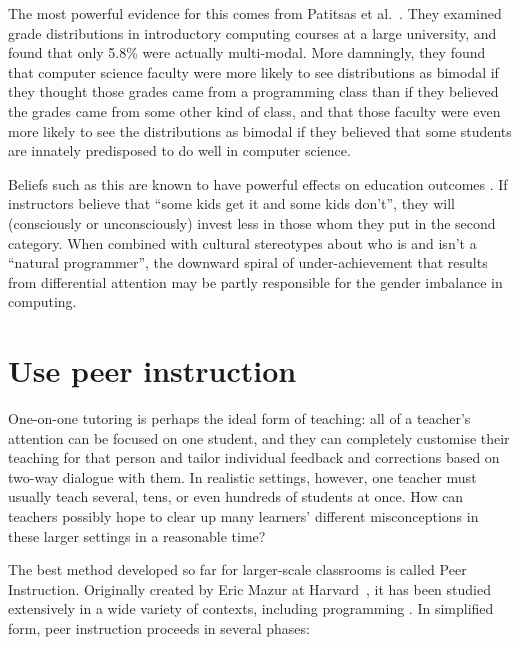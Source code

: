 \documentclass[10pt,letterpaper]{article}
\newcommand{\rulemajor}[2]{\section{#1}\label{#2}}
\newcommand{\evidence}[1]{}
\begin{document}
The most powerful evidence for this comes from Patitsas et al.~\cite{patitsas-bimodal}.
They examined grade distributions in introductory computing courses at a large university,
and found that only 5.8\% were actually multi-modal.
More damningly,
they found that computer science faculty were more likely to see distributions as bimodal
if they thought those grades came from a programming class
than if they believed the grades came from some other kind of class,
and that those faculty were even more likely to see the distributions as bimodal
if they believed that some students are innately predisposed to do well in computer science.

Beliefs such as this are known to have powerful effects on education outcomes
\cite{alvidrez-weinstein,brophy,jussim-eccles}.
If instructors believe that ``some kids get it and some kids don't'',
they will (consciously or unconsciously) invest less in those whom they put in the second category.
When combined with cultural stereotypes about who is and isn't a ``natural programmer'',
the downward spiral of under-achievement that results from differential attention
may be partly responsible for the gender imbalance in computing.

\rulemajor{Use peer instruction}{peer-instruction}
\evidence{High}

One-on-one tutoring is perhaps the ideal form of teaching:
all of a teacher's attention can be focused on one student,
and they can completely customise their teaching for that person
and tailor individual feedback and corrections based on two-way dialogue with them.
In realistic settings,
however,
one teacher must usually teach several, tens, or even hundreds of students at once.
How can teachers possibly hope to clear up many learners' different misconceptions
in these larger settings in a reasonable time?

The best method developed so far for larger-scale classrooms is called Peer Instruction.
Originally created by Eric Mazur at Harvard~\cite{mazur-peer-instruction},
it has been studied extensively in a wide variety of contexts,
including programming \cite{porter-multi,porter-success}.
In simplified form,
peer instruction proceeds in several phases:
\end{document}
